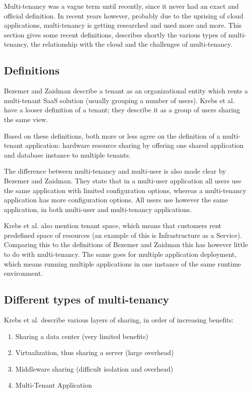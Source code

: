 Multi-tenancy was a vague term until recently, since it never had an exact and official definition. In recent years however, probably due to the uprising of cloud applications, multi-tenancy is getting researched and used more and more. This section gives some recent definitions, describes shortly the various types of multi-tenancy, the relationship with the cloud and the challenges of multi-tenancy.

\subsection{Definitions}

Bezemer and Zaidman\cite{bezemer2010multi} describe a tenant as an organizational entity which rents a multi-tenant SaaS solution (usually grouping a number of users). Krebs et al.\cite{krebs2012architecture} have a looser definition of a tenant; they describe it as a group of users sharing the same view.

Based on these definitions, both more or less agree on the definition of a multi-tenant application: hardware resource sharing by offering one shared application and database instance to multiple tenants.

The difference between multi-tenancy and multi-user is also made clear by Bezemer and Zaidman\cite{bezemer2010multi}. They state that in a multi-user application all users use the same application with limited configuration options, whereas a multi-tenancy application has more configuration options. All users use however the same application, in both multi-user and multi-tenancy applications.

Krebs et al.\cite{krebs2012architecture} also mention tenant space, which means that customers rent predefined space of resources (an example of this is Infrastructure as a Service). Comparing this to the definitions of Bezemer and Zaidman\cite{bezemer2010multi} this has however little to do with multi-tenancy. The same goes for multiple application deployment, which means running multiple applications in one instance of the same runtime environment.

\subsection{Different types of multi-tenancy}

Krebs et al.\cite{krebs2012architecture} describe various layers of sharing, in order of increasing benefits:
\begin{enumerate}
\item Sharing a data center (very limited benefits)
\item Virtualization, thus sharing a server (large overhead)
\item Middleware sharing (difficult isolation and overhead)
\item Multi-Tenant Application
\end{enumerate}

